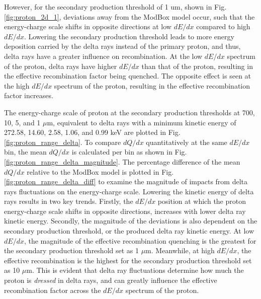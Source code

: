 However, for the secondary production threshold of 1 um, shown in Fig. \ref{fig:proton_2d_1}, deviations away from the ModBox model occur, such that the energy-charge scale shifts in opposite directions at low $dE/dx$ compared to high $dE/dx$. 
Lowering the secondary production threshold leads to more energy deposition carried by the delta rays instead of the primary proton, and thus, delta rays have a greater influence on recombination.
At the low $dE/dx$ spectrum of the proton, delta rays have higher $dE/dx$ than that of the proton, resulting in the effective recombination factor being quenched. 
The opposite effect is seen at the high $dE/dx$ spectrum of the proton, resulting in the effective recombination factor increases.

The energy-charge scale of proton at the secondary production thresholds at 700, 10, 5, and 1 $\mu$m, equivalent to delta rays with a minimum kinetic energy of 272.58, 14.60, 2.58, 1.06, and 0.99 keV are plotted in Fig. \ref{fig:proton_range_delta}. 
To compare $dQ/dx$ quantitatively at the same $dE/dx$ bin, the mean $dQ/dx$ is calculated per bin as shown in Fig. \ref{fig:proton_range_delta_magnitude}.
The percentage difference of the mean $dQ/dx$ relative to the ModBox model is plotted in Fig. \ref{fig:proton_range_delta_diff} to examine the magnitude of impacts from delta rays fluctuations on the energy-charge scale. 
Lowering the kinetic energy of delta rays results in two key trends.                                                           
Firstly, the $dE/dx$ position at which the proton energy-charge scale shifts in opposite directions, increases with lower delta ray kinetic energy. 
Secondly, the magnitude of the deviations is also dependent on the secondary production threshold, or the produced delta ray kinetic energy. 
At low $dE/dx$, the magnitude of the effective recombination quenching is the greatest for the secondary production threshold set as 1 $\mu$m. 
Meanwhile, at high $dE/dx$, the effective recombination is the highest for the secondary production threshold set as 10 $\mu$m. 
This is evident that delta ray fluctuations determine how much the proton is \textit{dressed} in delta rays, and can greatly influence the effective recombination factor across the $dE/dx$ spectrum of the proton. 
